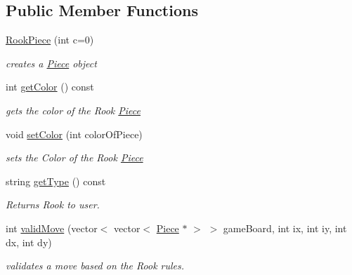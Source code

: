 \subsection*{Public Member Functions}
\begin{DoxyCompactItemize}
\item 
\hypertarget{classRookPiece_a4f3df41645f99a11dcbf3045195a9a6a}{
\hyperlink{classRookPiece_a4f3df41645f99a11dcbf3045195a9a6a}{RookPiece} (int c=0)}
\label{classRookPiece_a4f3df41645f99a11dcbf3045195a9a6a}

\begin{DoxyCompactList}\small\item\em creates a \hyperlink{classPiece}{Piece} object \item\end{DoxyCompactList}\item 
int \hyperlink{classRookPiece_a15b00afd7fe0fe1035c64b884870c6e1}{getColor} () const 
\begin{DoxyCompactList}\small\item\em gets the color of the Rook \hyperlink{classPiece}{Piece} \item\end{DoxyCompactList}\item 
void \hyperlink{classRookPiece_ad10584bf27bf3f6f109074b878ef840d}{setColor} (int colorOfPiece)
\begin{DoxyCompactList}\small\item\em sets the Color of the Rook \hyperlink{classPiece}{Piece} \item\end{DoxyCompactList}\item 
string \hyperlink{classRookPiece_a45d8858e75e550b72d27d49da0230c0a}{getType} () const 
\begin{DoxyCompactList}\small\item\em Returns Rook to user. \item\end{DoxyCompactList}\item 
int \hyperlink{classRookPiece_a451d36ccd1ccba8001acd3fff364904e}{validMove} (vector$<$ vector$<$ \hyperlink{classPiece}{Piece} $\ast$ $>$ $>$ gameBoard, int ix, int iy, int dx, int dy)
\begin{DoxyCompactList}\small\item\em validates a move based on the Rook rules. \item\end{DoxyCompactList}\end{DoxyCompactItemize}


